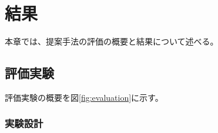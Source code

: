 \chapter{結果}
\label{chap:result}

本章では、提案手法の評価の概要と結果について述べる。

\section{評価実験}

評価実験の概要を図\ref{fig:evaluation}に示す。


\subsection{実験設計}


